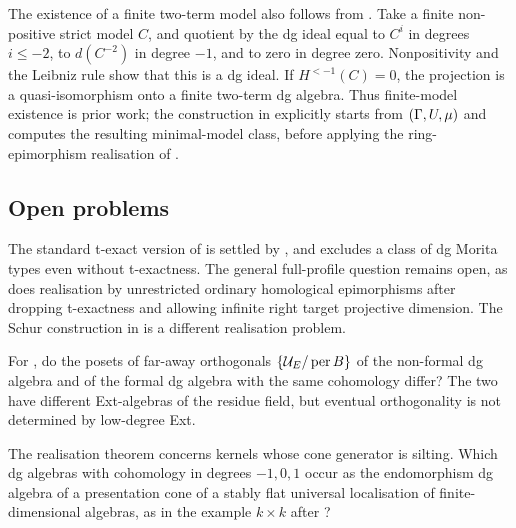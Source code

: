 \begin{remark}\label{rem:finite-strict-priority}
The existence of a finite two-term model also follows from \cite[Appendix~A, Theorem~A.3]{Goodbody24}.  Take a finite non-positive strict model \(C\), and quotient by the dg ideal equal to \(C^i\) in degrees \(i\le-2\), to \(d(C^{-2})\) in degree \(-1\), and to zero in degree zero.  Nonpositivity and the Leibniz rule show that this is a dg ideal.  If \(H^{<-1}(C)=0\), the projection is a quasi-isomorphism onto a finite two-term dg algebra.  Thus finite-model existence is prior work; the construction in  explicitly starts from \((\Gamma,U,\mu)\) and computes the resulting minimal-model class, before applying the ring-epimorphism realisation of .
\end{remark}



\subsection{Open problems}

The standard t-exact version of  is settled by , and  excludes a class of dg Morita types even without t-exactness.  The general full-profile question remains open, as does realisation by unrestricted ordinary homological epimorphisms after dropping t-exactness and allowing infinite right target projective dimension.  The Schur construction in  is a different realisation problem.

\begin{question}\label{q:profile-m3}
For , do the posets of far-away orthogonals \(\{\mathcal U_E/\operatorname{per} B\}\) of the non-formal dg algebra and of the formal dg algebra with the same cohomology differ?  The two have different Ext-algebras of the residue field, but eventual orthogonality is not determined by low-degree Ext.
\end{question}

\begin{question}\label{q:nonsilting}
The realisation theorem concerns kernels whose cone generator is silting.  Which dg algebras with cohomology in degrees \(-1,0,1\) occur as the endomorphism dg algebra of a presentation cone of a stably flat universal localisation of finite-dimensional algebras, as in the example \(k\times k\) after ?
\end{question}
